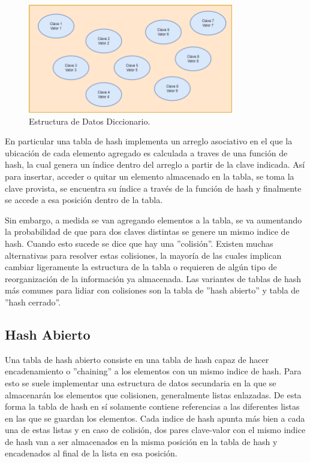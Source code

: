 \documentclass[titlepage,a4paper]{article}
\begin{document}
\begin{figure}[H]
\centering
\includegraphics[width=0.8\textwidth]{1_diccionario.png}
\caption{\label{fig:seq01}Estructura de Datos Diccionario.}
\end{figure}

En particular una tabla de hash implementa un arreglo asociativo en el que la
ubicación de cada elemento agregado es calculada a traves de una función de
hash, la cual genera un índice dentro del arreglo a partir de la clave indicada.
Así para insertar, acceder o quitar un elemento almacenado en la tabla, se toma
la clave provista, se encuentra su índice a través de la función de hash y
finalmente se accede a esa posición dentro de la tabla. 

Sin embargo, a medida se van agregando elementos a la tabla, se va aumentando
la probabilidad de que para dos claves distintas se genere un mismo indice de
hash. Cuando esto sucede se dice que hay una ''colisión''. Existen muchas
alternativas para resolver estas colisiones, la mayoría de las cuales implican
cambiar ligeramente la estructura de la tabla o requieren de algún tipo de
reorganización de la información ya almacenada. Las variantes de tablas de hash
más comunes para lidiar con colisiones son la tabla de ''hash abierto'' y tabla
de ''hash cerrado''. 

\subsection{Hash Abierto}

Una tabla de hash abierto
consiste en una tabla de hash capaz de hacer encadenamiento o ''chaining'' a los
elementos con un mismo indice de hash. Para esto se suele implementar una
estructura de datos secundaria en la que se almacenarán los elementos que
colisionen, generalmente listas enlazadas. De esta forma la tabla de hash en sí
solamente contiene referencias a las diferentes listas en las que se guardan los
elementos. Cada indice de hash apunta más bien a cada una de estas listas y en
caso de colisión, dos pares clave-valor con el mismo indice de hash van a ser
almacenados en la misma posición en la tabla de hash y encadenados al final de
la lista en esa posición.
\end{document}
